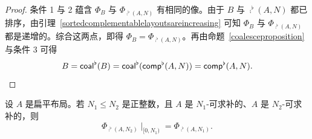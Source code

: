 \begin{proof}
    条件 1 与 2 蕴含 $\Phi_{B}$ 与 $\Phi_{\comp^\flat(A,N)}$ 有相同的像。由于 $B$ 与 $\comp^\flat(A,N)$ 都已排序，由引理~\ref{sortedcomplementablelayoutsareincreasing} 可知 $\Phi_{B}$ 与 $\Phi_{\comp^\flat(A,N)}$ 都是递增的。综合这两点，即得 $\Phi_{B} = \Phi_{\comp^\flat(A,N)}$。再由命题~\ref{coalesceproposition} 与条件 3 可得
    \[
    B = \mathsf{coal}^\flat(B) = \mathsf{coal}^\flat(\mathsf{comp}^\flat(A,N)) = \mathsf{comp}^\flat(A,N).
    \]
\end{proof}


\begin{lemma}\label{compatibilityofNcomplements}
    设 $A$ 是扁平布局。若 $N_1 \leq N_2$ 是正整数，且 $A$ 是 $N_1$-可求补的、$A$ 是 $N_2$-可求补的，则
    \[
    \Phi_{\comp^\flat(A,N_2)} \mid_{[0,N_1)} = \Phi_{\comp^\flat(A,N_1)}.
    \]
\end{lemma}

